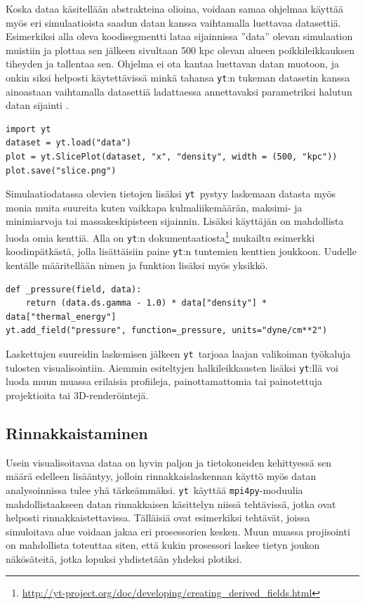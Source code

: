 \documentclass[12pt,a4paper]{article}
\newcommand{\yt}{\texttt{yt}}
\begin{document}
Koska dataa käsitellään abstrakteina olioina, voidaan samaa ohjelmaa käyttää myös eri simulaatioista saadun datan kanssa vaihtamalla luettavaa datasettiä. Esimerkiksi alla oleva koodisegmentti lataa sijainnissa ''data'' olevan simulaation muistiin ja plottaa sen jälkeen sivultaan 500 kpc olevan alueen poikkileikkauksen tiheyden ja tallentaa sen. Ohjelma ei ota kantaa luettavan datan muotoon, ja onkin siksi helposti käytettävissä minkä tahansa \yt :n tukeman datasetin kanssa ainoastaan vaihtamalla datasettiä ladattaessa annettavaksi parametriksi halutun datan sijainti \cite{yt, cookbook}.

\begin{minipage}{\textwidth}
\lstset{style=python}
\begin{lstlisting}
import yt
dataset = yt.load("data")
plot = yt.SlicePlot(dataset, "x", "density", width = (500, "kpc"))
plot.save("slice.png")
\end{lstlisting}
\end{minipage}

Simulaatiodatassa olevien tietojen lisäksi \yt\ pystyy laskemaan datasta myös monia muita suureita kuten vaikkapa kulmaliikemäärän, maksimi- ja minimiarvoja tai massakeskipisteen sijainnin. Lisäksi käyttäjän on mahdollista luoda omia kenttiä. Alla on \yt :n dokumentaatiosta\footnote{\url{http://yt-project.org/doc/developing/creating_derived_fields.html}} mukailtu esimerkki koodinpätkästä, jolla lisättäisiin paine \yt :n tuntemien kenttien joukkoon. Uudelle kentälle määritellään nimen ja funktion lisäksi myös yksikkö. \cite{yt, derivedfields}

\begin{minipage}{\textwidth}
\lstset{style=python}
\begin{lstlisting}
def _pressure(field, data):
    return (data.ds.gamma - 1.0) * data["density"] * data["thermal_energy"]
yt.add_field("pressure", function=_pressure, units="dyne/cm**2")
\end{lstlisting}%
\end{minipage}

Laskettujen suureidin laskemisen jälkeen \yt\ tarjoaa laajan valikoiman työkaluja tulosten visualisointiin. Aiemmin esiteltyjen halkileikkausten lisäksi \yt :llä voi luoda muun muassa erilaisia profiileja, painottamattomia tai painotettuja projektioita tai 3D-renderöintejä. \cite{yt}

\subsection{Rinnakkaistaminen}
Usein visualisoitavaa dataa on hyvin paljon ja tietokoneiden kehittyessä sen määrä edelleen lisääntyy, jolloin rinnakkaislaskennan käyttö myös datan analysoinnissa tulee yhä tärkeämmäksi. \yt\ käyttää \texttt{mpi4py}-moduulia mahdollistaakseen datan rinnakkaisen käsittelyn niissä tehtävissä, jotka ovat helposti rinnakkaistettavissa. Tälläisiä ovat esimerkiksi tehtävät, joissa simuloitava alue voidaan jakaa eri prosessorien kesken. Muun muassa projisointi on mahdollista toteuttaa siten, että kukin prosessori laskee tietyn joukon näkösäteitä, jotka lopuksi yhdistetään yhdeksi plotiksi. \cite{yt}
\end{document}
